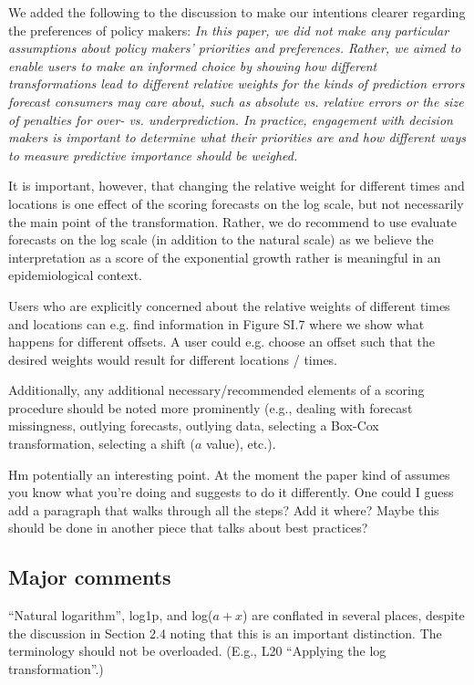 \documentclass{article}
\newcommand{\red}{\color{red}}
\newcommand{\black}{\color{black}}
\begin{document}
\black
 
We added the following to the discussion to make our intentions clearer regarding the preferences of policy makers: 
\textit{In this paper, we did not make any particular assumptions about policy makers' priorities and preferences. Rather, we aimed to enable users to make an informed choice by showing how different transformations lead to different relative weights for the kinds of prediction errors forecast consumers may care about, such as absolute vs. relative errors or the size of penalties for over- vs. underprediction. In practice, engagement with decision makers is important to determine what their priorities are and how different ways to measure predictive importance should be weighed.}

It is important, however, that changing the relative weight for different times and locations is one effect of the scoring forecasts on the log scale, but not necessarily the main point of the transformation. Rather, we do recommend to use evaluate forecasts on the log scale (in addition to the natural scale) as we believe the interpretation as a score of the exponential growth rather is meaningful in an epidemiological context. 

Users who are explicitly concerned about the relative weights of different times and locations can e.g. find information in Figure SI.7 where we show what happens for different offsets. A user could e.g. choose an offset such that the desired weights would result for different locations / times. 

\red
Additionally, any additional necessary/recommended elements of a scoring procedure should be noted more prominently (e.g., dealing with forecast missingness, outlying forecasts, outlying data, selecting a Box-Cox transformation, selecting a shift ($a$ value), etc.).

\black
Hm potentially an interesting point. At the moment the paper kind of assumes you know what you're doing and suggests to do it differently. One could I guess add a paragraph that walks through all the steps? Add it where? Maybe this should be done in another piece that talks about best practices? 

\red

\subsection{Major comments}
``Natural logarithm'', log1p, and log($a + x$) are conflated in several places, despite the discussion in Section 2.4 noting that this is an important distinction. The terminology should not be overloaded. (E.g., L20 ``Applying the log transformation''.)
\end{document}
